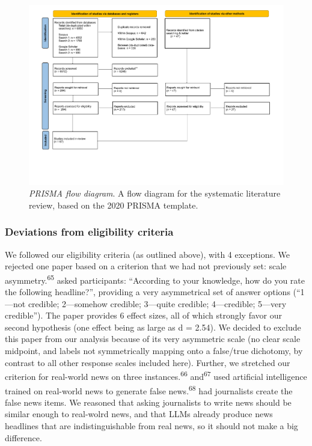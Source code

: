\documentclass[
  man]{apa6}
\begin{document}
\begin{figure}
\centering
\includegraphics{literature_search/PRISMA_2020_flow_diagram.pdf}
\caption{\label{fig:prisma-flowchart}\emph{PRISMA flow diagram}. A flow diagram for the systematic literature review, based on the 2020 PRISMA template.}
\end{figure}

\subsubsection{Deviations from eligibility criteria}\label{deviations-from-eligibility-criteria}

We followed our eligibility criteria (as outlined above), with 4 exceptions. We rejected one paper based on a criterion that we had not previously set: scale asymmetry.\textsuperscript{65} asked participants: ``According to your knowledge, how do you rate the following headline?'', providing a very asymmetrical set of answer options (``1---not credible; 2---somehow credible; 3---quite credible; 4---credible; 5---very credible''). The paper provides 6 effect sizes, all of which strongly favor our second hypothesis (one effect being as large as d = 2.54). We decided to exclude this paper from our analysis because of its very asymmetric scale (no clear scale midpoint, and labels not symmetrically mapping onto a false/true dichotomy, by contrast to all other response scales included here). Further, we stretched our criterion for real-world news on three instances.\textsuperscript{66} and\textsuperscript{67} used artificial intelligence trained on real-world news to generate false news.\textsuperscript{68} had journalists create the false news items. We reasoned that asking journalists to write news should be similar enough to real-wolrd news, and that LLMs already produce news headlines that are indistinguishable from real news, so it should not make a big difference.
\end{document}
